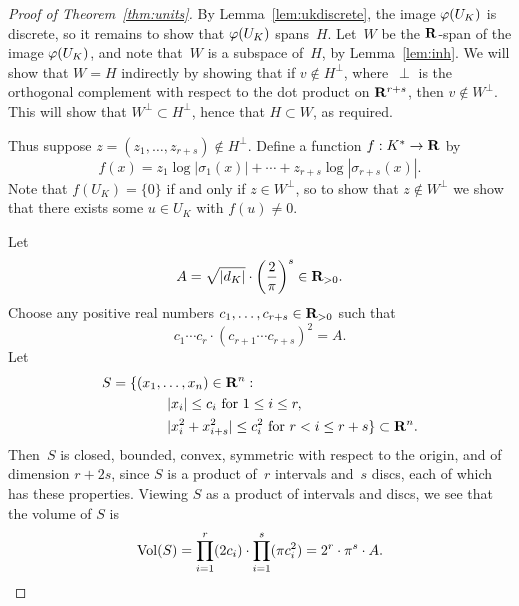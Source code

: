 \begin{proof}[Proof of Theorem~\ref{thm:units}]
By Lemma~\ref{lem:ukdiscrete}, the image $\varphi(U_K)$
is discrete, so it remains to show that $\varphi(U_K)$
spans~$H$.  
Let~$W$ be the $\mathbf{R}$-span of the image
$\varphi(U_K)$, and note that~$W$ is a subspace of~$H$,
by Lemma~\ref{lem:inh}.  We will show
that $W=H$ indirectly by showing that if $v\not \in H^{\perp}$,
where~$\perp$ is the orthogonal complement 
with respect to the dot product on $\mathbf{R}^{r+s}$, then
$v\not \in W^{\perp}$.  This will show that $W^{\perp}\subset
H^{\perp}$, hence that $H\subset W$, as required.

Thus suppose $z=(z_1,\ldots,z_{r+s})\not\in H^{\perp}$.  
Define a function $f:K^*\to \mathbf{R}$ by 
\begin{equation}\label{eqn:f}
  f(x) = z_1\log|\sigma_1(x)| + \cdots + z_{r+s}\log|\sigma_{r+s}(x)|.
\end{equation}
Note that $f(U_K)=\{0\}$ if and only if $z\in W^{\perp}$,
so to show that $z\not\in W^{\perp}$ we show that there exists some $u\in
U_K$ with $f(u)\neq 0$.

Let 
$$
  A=\sqrt{|d_K|} \cdot \left( \frac{2}{\pi}\right)^s \in \mathbf{R}_{>0}.
$$
Choose any positive real numbers $c_1,\ldots, c_{r+s} \in \mathbf{R}_{>0}$
such that
$$
  c_1\cdots c_r\cdot (c_{r+1}\cdots c_{r+s})^2 = A.
$$
Let 
\begin{align*}
  S &= \{(x_1,\ldots,x_n) \in \mathbf{R}^n : \\
    &\qquad\qquad |x_i|\leq c_i\text{ for } 1\leq i \leq r,\\
    &\qquad\qquad |x_i^2 + x_{i+s}^2| \leq c_i^2 \text{ for } r<i\leq r+s\} \subset \mathbf{R}^n.
\end{align*}
Then~$S$ is closed, bounded, convex, symmetric with respect to the
origin, and of dimension $r+2s$, since $S$ is a product of~$r$ intervals
and~$s$ discs, each of which has these properties.
Viewing $S$ as a product of intervals and discs, we see that the volume of $S$ is
$$
  \operatorname{Vol}(S) = \prod_{i=1}^r (2c_i) \cdot \prod_{i=1}^s (\pi c_i^2) 
          = 2^r\cdot \pi^s \cdot A.
$$


\end{proof}
